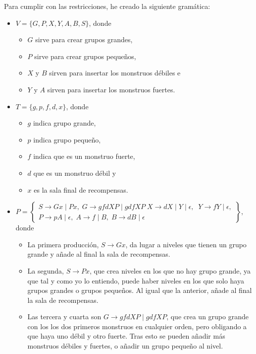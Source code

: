 \documentclass[11pt,a4paper]{article}
\begin{document}
Para cumplir con las restricciones, he creado la siguiente gramática:
	\begin{itemize}
		\item $V=\{G,P,X,Y,A,B,S\}$, donde
			\begin{itemize}
				\item $G$ sirve para crear grupos grandes,
				\item $P$ sirve para crear grupos pequeños,
				\item $X$ y $B$ sirven para insertar los monstruos débiles e
				\item $Y$ y $A$ sirven para insertar los monstruos fuertes.
			\end{itemize}
		\item $T=\{g,p,f,d,x\}$, donde
			\begin{itemize}
				\item $g$ indica grupo grande,
				\item $p$ indica grupo pequeño,
				\item $f$ indica que es un monstruo fuerte,
				\item $d$ que es un monstruo débil y
				\item $x$ es la sala final de recompensas.
			\end{itemize}
		\item $P=\left\{\begin{array}{c}
			S\rightarrow Gx \mid Px, \; 
			G\rightarrow gfdXP \mid gdfXP \;
			X\rightarrow dX \mid Y \mid \epsilon, \; \;
			Y\rightarrow fY \mid \epsilon, \\ 
			P\rightarrow pA \mid \epsilon, \; 
			A\rightarrow f \mid B, \; 
			B\rightarrow dB \mid \epsilon
		\end{array}\right\}$, donde
		\begin{itemize}
			\item La primera producción, $S\rightarrow Gx$, da lugar a niveles que tienen un grupo grande y añade al final la sala de recompensas.
			\item La segunda, $S\rightarrow Px$, que crea niveles en los que no hay grupo grande, ya que tal y como yo lo entiendo, puede haber niveles en los que solo haya grupos grandes o grupos pequeños. Al igual que la anterior, añade al final la sala de recompensas.
			\item Las tercera y cuarta son $G\rightarrow gfdXP \mid gdfXP$, que crea un grupo grande con los los dos primeros monstruos en cualquier orden, pero obligando a que haya uno débil y otro fuerte. Tras esto se pueden añadir más monstruos débiles y fuertes, o añadir un grupo pequeño al nivel.

\end{itemize}
\end{itemize}
\end{document}
